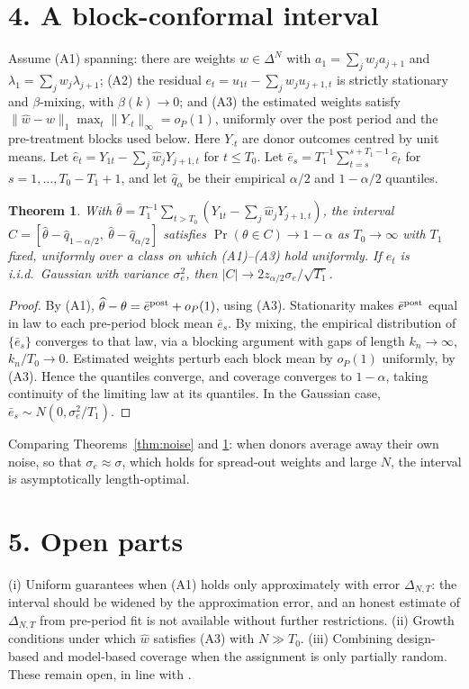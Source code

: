 \documentclass[11pt]{article}
\newtheorem{theorem}{Theorem}
\theoremstyle{definition}
\begin{document}
\section*{4. A block-conformal interval}
Assume (A1) spanning: there are weights $w\in\Delta^N$ with $a_1=\sum_jw_ja_{j+1}$ and $\lambda_1=\sum_jw_j\lambda_{j+1}$;
(A2) the residual $e_t=u_{1t}-\sum_jw_ju_{j+1,t}$ is strictly stationary and $\beta$-mixing, with $\beta(k)\to0$; and
(A3) the estimated weights satisfy $\|\widehat w-w\|_1\max_{t}\|Y_{\cdot t}\|_\infty=o_P(1)$, uniformly over the post
period and the pre-treatment blocks used below. Here $Y_{\cdot t}$ are donor outcomes centred by unit means.
Let $\widehat e_t=Y_{1t}-\sum_j\widehat w_jY_{j+1,t}$ for $t\le T_0$. Let
$\bar e_s=T_1^{-1}\sum_{t=s}^{s+T_1-1}\widehat e_t$ for $s=1,\dots,T_0-T_1+1$, and let $\widehat q_{\alpha}$ be their
empirical $\alpha/2$ and $1-\alpha/2$ quantiles.
\begin{theorem}\label{thm:conf}
With $\widehat\theta=T_1^{-1}\sum_{t>T_0}(Y_{1t}-\sum_j\widehat w_jY_{j+1,t})$, the interval
$C=[\widehat\theta-\widehat q_{1-\alpha/2},\ \widehat\theta-\widehat q_{\alpha/2}]$ satisfies
$\Pr(\theta\in C)\to1-\alpha$ as $T_0\to\infty$ with $T_1$ fixed, uniformly over a class on which (A1)--(A3) hold uniformly.
If $e_t$ is i.i.d.\ Gaussian with variance $\sigma_e^2$, then $|C|\to2z_{\alpha/2}\sigma_e/\sqrt{T_1}$.
\end{theorem}
\begin{proof}
By (A1), $\widehat\theta-\theta=\bar e^{\rm post}+o_P(1)$, using (A3). Stationarity makes $\bar e^{\rm post}$ equal in law to
each pre-period block mean $\bar e_s$. By mixing, the empirical distribution of $\{\bar e_s\}$ converges to that law, via a
blocking argument with gaps of length $k_n\to\infty$, $k_n/T_0\to0$. Estimated weights perturb each block mean by
$o_P(1)$ uniformly, by (A3). Hence the quantiles converge, and coverage converges to $1-\alpha$, taking continuity of the
limiting law at its quantiles. In the Gaussian case, $\bar e_s\sim N(0,\sigma_e^2/T_1)$.
\end{proof}
Comparing Theorems~\ref{thm:noise} and \ref{thm:conf}: when donors average away their own noise, so that
$\sigma_e\approx\sigma$, which holds for spread-out weights and large $N$, the interval is asymptotically length-optimal.

\section*{5. Open parts}
(i) Uniform guarantees when (A1) holds only approximately with error $\Delta_{N,T}$: the interval should be widened by the
approximation error, and an honest estimate of $\Delta_{N,T}$ from pre-period fit is not available without further
restrictions. (ii) Growth conditions under which $\widehat w$ satisfies (A3) with $N\gg T_0$. (iii) Combining design-based and
model-based coverage when the assignment is only partially random. These remain open, in line with \cite{adh10,adh15,aahiw}.
\end{document}
